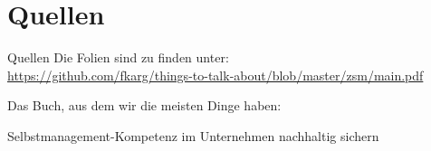\section{Quellen}
\begin{frame}{Quellen}
    Die Folien sind zu finden unter: \\
    \url{https://github.com/fkarg/things-to-talk-about/blob/master/zsm/main.pdf}

	\hspace{2cm}

    Das Buch, aus dem wir die meisten Dinge haben:

    \begin{thebibliography}{10}
    \beamertemplatebookbibitems
        Selbstmanagement-Kompetenz im Unternehmen nachhaltig sichern

    \newpage
    

\end{thebibliography}
\end{frame}
